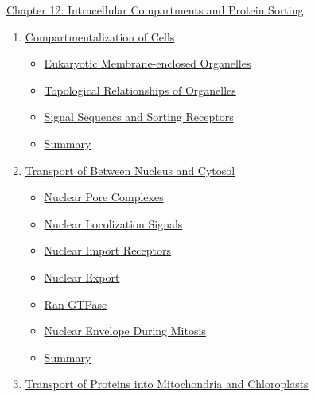 \documentclass[12pt,letterpaper]{article}
\newcommand{\thetitle}{\hypertarget{home}{Cellular Biology}}
\begin{document}

\clearpage
\renewcommand{\thetitle}{\hypertarget{12}{Intracellular Compartments and Protein Sorting}}
\hypertarget{12}{}

\begin{chapbox}{\hyperlink{home}{Chapter 12: Intracellular Compartments and Protein Sorting}}
    \begin{enumerate}
        \item \hyperlink{12.1}{Compartmentalization of Cells}
            \begin{itemize}
                \item \hyperlink{12.1.1}{Eukaryotic Membrane-enclosed Organelles}
                \item \hyperlink{12.1.2}{Topological Relationships of Organelles}
                \item \hyperlink{12.1.3}{Signal Sequencs and Sorting Receptors}
                \item \hyperlink{12.1.r}{Summary}
            \end{itemize}
        \item \hyperlink{12.2}{Transport of Between Nucleus and Cytosol}
            \begin{itemize}
                \item \hyperlink{12.2.1}{Nuclear Pore Complexes}
                \item \hyperlink{12.2.2}{Nuclear Locolization Signals}
                \item \hyperlink{12.2.3}{Nuclear Import Receptors}
                \item \hyperlink{12.2.4}{Nuclear Export}
                \item \hyperlink{12.2.5}{Ran GTPase}
                \item \hyperlink{12.2.6}{Nuclear Envelope During Mitosis}
                \item \hyperlink{12.2.r}{Summary}
            \end{itemize}
        \item \hyperlink{12.3}{Transport of Proteins into Mitochondria and Chloroplasts}

\end{enumerate}
\end{chapbox}
\end{document}

